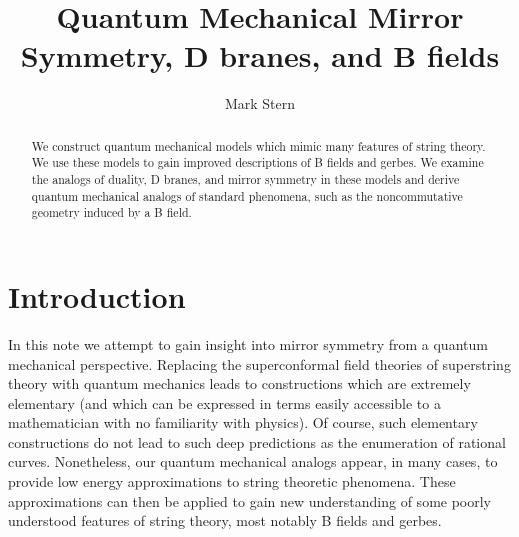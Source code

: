 \documentclass[a4paper,11pt]{amsart}
\title{Quantum Mechanical Mirror Symmetry, D branes, and B fields}
\author{Mark Stern}
\date{}
\begin{document}
\begin{abstract} We construct quantum mechanical models which mimic many
features of string theory. We use these models to gain improved descriptions of
B fields and gerbes. We examine the analogs of \coordHE{} duality, D branes, and mirror
symmetry in these models and derive quantum mechanical analogs of standard
 phenomena, such as the noncommutative geometry induced by a B field.
 \end{abstract} 
 \maketitle
\section{Introduction}
In this note we attempt to gain insight into mirror symmetry from a quantum
mechanical perspective. Replacing the superconformal field theories 
of superstring theory with quantum mechanics leads to constructions which are 
extremely elementary (and which can be expressed in terms easily accessible to
 a mathematician with no familiarity with physics). Of course, such elementary 
 constructions do not lead to such deep predictions as the enumeration
of rational curves. Nonetheless,  our quantum mechanical analogs 
appear, in many cases, to provide low energy approximations to string theoretic
phenomena. These approximations can then be applied to gain new understanding 
of some poorly understood features of string theory, most notably B fields and 
gerbes.
\end{document}

